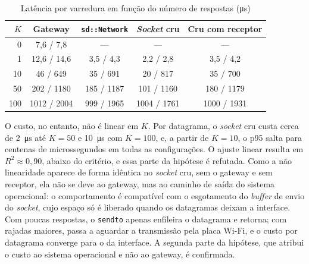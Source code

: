 \documentclass[
    12pt,
    oneside,
    a4paper,
    chapter=TITLE,
    section=TITLE,
    english,
    brazil
]{abntex2}
\begin{document}
\begin{table}[H]
\centering
\fontsize{10}{12}\selectfont
\caption{Latência por varredura em função do número de respostas (\si{\micro\second})}
\label{tab:h3}
\begin{tabular}{@{}rcccc@{}}
\toprule
$K$ & \textbf{Gateway} & \textbf{\texttt{sd::Network}} &
 \textbf{\textit{Socket} cru} & \textbf{Cru com receptor} \\
\midrule
0 & 7,6 / 7,8 & --- & --- & --- \\
1 & 12,6 / 14,6 & 3,5 / 4,3 & 2,2 / 2,8 & 3,5 / 4,2 \\
10 & 46 / 649 & 35 / 691 & 20 / 817 & 35 / 700 \\
50 & 202 / \num{1180} & 185 / \num{1187} & 101 / \num{1160} & 180 / \num{1179} \\
100 & \num{1012} / \num{2004} & 999 / \num{1965} & \num{1004} / \num{1761} & \num{1000} / \num{1931} \\
\bottomrule
\end{tabular}
\end{table}

O custo, no entanto, não é linear em $K$. Por datagrama, o
\textit{socket} cru custa cerca de \SI{2}{\micro\second} até $K = 50$ e
\SI{10}{\micro\second} com $K = 100$, e, a partir de $K = 10$, o p95 salta
para centenas de microssegundos em todas as configurações. O ajuste linear
resulta em $R^2 \approx 0{,}90$, abaixo do critério, e essa parte da
hipótese é refutada. Como a não linearidade aparece de forma idêntica no
\textit{socket} cru, sem o gateway e sem receptor, ela não se deve ao
gateway, mas ao caminho de saída do sistema operacional: o comportamento é
compatível com o esgotamento do \textit{buffer} de envio do
\textit{socket}, cujo espaço só é liberado quando os datagramas deixam a
interface. Com poucas respostas, o \texttt{sendto} apenas enfileira o
datagrama e retorna; com rajadas maiores, passa a aguardar a transmissão
pela placa Wi-Fi, e o custo por datagrama converge para o da interface. A
segunda parte da hipótese, que atribui o custo ao sistema operacional e
não ao gateway, é confirmada.
\end{document}
